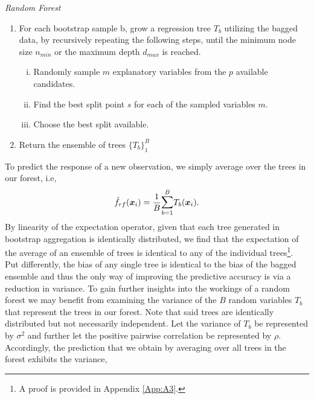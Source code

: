 \documentclass[a4paper,12pt, headsepline]{scrartcl}
\numberwithin{equation}{section}
\begin{document}

{}
{\centering
\begin{minipage}{.9\linewidth}
	\begin{algorithm}[H]
		\caption{\textit{Random Forest}}\label{alg:one}
		\begin{enumerate}
			\item For each bootstrap sample b, grow a regression tree $T_b$ utilizing the bagged data, by recursively repeating the following steps, until the minimum node size $n_{min}$ or the maximum depth $d_{max}$ is reached.
			\begin{enumerate}[i.]
				\item Randomly sample $m$ explanatory variables from the $p$ available candidates.
				\item Find the best split point $s$ for each of the sampled variables $m$.
				\item Choose the best split available.
			\end{enumerate}
			\item Return the ensemble of trees $\{T_b\}_1^B$
		\end{enumerate}
	\end{algorithm}
\end{minipage}
\par
}
To predict the response of a new observation, we simply average over the trees in our forest, i.e,
\[
\hat f_{rf}(\bm x_i) = \frac{1}{B} \mathlarger{\sum}\limits_{b = 1}^B T_b(\bm x_i).
\]
 By linearity of the expectation operator, given that each tree generated in bootstrap aggregation is identically distributed, we find that the expectation of the average of an ensemble of trees is identical to any of the individual trees\footnote{A proof is provided in Appendix \ref{App:A3}.}. Put differently, the bias of any single tree is identical to the bias of the bagged ensemble and thus the only way of improving the predictive accuracy is via a reduction in variance.
 To gain further insights into the workings of a random forest we may benefit from examining the variance of the $B$ random variables $T_b$ that represent the trees in our forest. Note that said trees are identically distributed but not necessarily independent. Let the variance of $T_b$ be represented by $\sigma^2$ and further let the positive pairwise correlation be represented by $\rho$. Accordingly, the prediction that we obtain by averaging over all trees in the forest exhibits the variance, 
\end{document}
